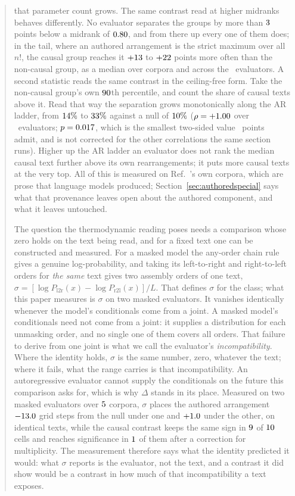 \documentclass[11pt]{article}
\begin{document}
\begin{abstract}
that parameter count grows.  The same contrast read at higher midranks
behaves differently.  No evaluator separates the groups by more
than $\TailBelowOnsetMax$ points below a midrank of $\TailOnsetThr$, and
from there up every one of them does; in the tail, where an
authored arrangement is the strict maximum over all $n!$, the causal group
reaches it $\TailDiffGPTtwo$ to $\TailDiffQwen$ points more often than the
non-causal group, as a median over corpora and across the \TrendNEval\
evaluators.  A second statistic reads the same contrast in the ceiling-free form.  Take
the non-causal group's own $\TailZQ$th percentile, and count the share of
causal texts above it.  Read that way the separation grows monotonically
along the AR ladder, from
$\TailZGPTtwo\%$ to $\TailZQwen\%$ against a null of $\TailZNull\%$
($\rho = \TailZTrendRho$ over \TrendNEval\ evaluators; $p = \TailZTrendP$,
which is the smallest two-sided value \TrendNEval\ points admit, and is not
corrected for the other correlations the same section runs).  Higher up the AR ladder an evaluator does not rank the
median causal text further above its own rearrangements; it puts more
causal texts at the very top.  All of this is measured on
Ref.~\cite{sagawa2026}'s own corpora, which are prose that language models
produced; Section~\ref{sec:authoredspecial} says
what that provenance leaves open about the authored component, and what it
leaves untouched.

The question the thermodynamic reading poses needs a comparison whose zero
holds on the text being read, and for a fixed text one can be constructed
and measured.
For a masked model the any-order chain rule gives a genuine log-probability,
and taking its left-to-right and right-to-left orders for \emph{the same}
text gives two assembly orders of one text,
$\sigma = [\log P_{\mathrm{l2r}}(x) - \log P_{\mathrm{r2l}}(x)]/L$.  That
defines $\sigma$ for the class; what this paper measures is $\sigma$ on two
masked evaluators.  It vanishes identically whenever the model's
conditionals come from a joint.
A masked model's conditionals need not come from a joint: it supplies a
distribution for each unmasking order, and no single one of them covers all
orders.  That failure to derive from one joint is what we call the
evaluator's \emph{incompatibility}.  Where the identity holds, $\sigma$ is
the same number, zero, whatever the text; where it fails, what the range
carries is that incompatibility.  An
autoregressive evaluator cannot supply the conditionals on the future this
comparison asks for, which is why $\Delta$ stands in its place.  Measured on two masked evaluators over
$\FbNCorpora$ corpora, $\sigma$ places the authored arrangement
$\FbAuthoredStepsLLaDA$ grid steps from the null under one and
$\FbAuthoredStepsBertBase$ under the other, on identical texts, while the
causal contrast keeps the same sign in $\FbNNegative$ of $\FbNCells$ cells
and reaches significance in $\FbNSurviving$ of them after a correction for
multiplicity.  The measurement therefore says what the identity predicted
it would: what $\sigma$ reports is the evaluator, not the text, and a contrast it did show would be a contrast in how much of that
incompatibility a text exposes.


\end{abstract}
\end{document}
